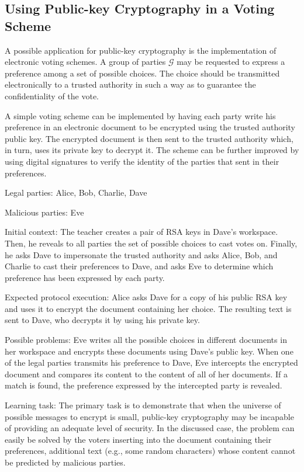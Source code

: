 \documentclass[conference]{IEEEtran}
\begin{document}
\subsection{ Using Public-key Cryptography in a Voting Scheme}

A possible application for public-key cryptography is the
implementation of electronic voting schemes. A group of
parties ${\mathcal G}$ may be requested to express
a preference among a set of possible choices. The choice
should be transmitted electronically to a trusted authority
in such a way as to guarantee the confidentiality of the vote. 


A simple voting scheme can be implemented by having each party
write his preference in an electronic document to be encrypted
using the trusted authority public key. The encrypted document
is then sent to the trusted authority which, in turn, uses
its private key to decrypt it. The scheme can be further
improved by using digital signatures to verify the identity of the parties that sent in their preferences. 

{\sc Legal parties:} Alice, Bob, Charlie, Dave

{\sc Malicious parties:} Eve

{\sc Initial context:} The teacher creates a pair of RSA keys
in Dave's workspace. Then, he reveals to all parties the set of
possible choices to cast votes on. Finally, he asks Dave to
impersonate the trusted authority and asks Alice, Bob,
and Charlie to cast their preferences to Dave, and asks Eve to determine which preference has been expressed by each party.

{\sc Expected protocol execution:} Alice asks Dave for
a copy of his public RSA key and uses it to encrypt the
document containing her choice. The resulting text is sent to Dave, who decrypts it by using his private key.

{\sc Possible problems:} Eve writes all the possible choices in
different documents in her workspace and encrypts these documents
using Dave's public key. When one of the legal parties transmits
his preference to Dave, Eve intercepts the encrypted document
and compares its content to the content of all of her documents.
If a match is found, the preference expressed by the intercepted party is revealed.

{\sc Learning task:} The primary task is to demonstrate that
when the universe of possible messages to encrypt is small,
public-key cryptography may be incapable of providing an adequate
level of security. In the discussed case, the problem can easily
be solved by the voters inserting into the document
containing their preferences, additional text
(e.g., some random characters) whose content cannot be predicted by malicious parties.
\end{document}
